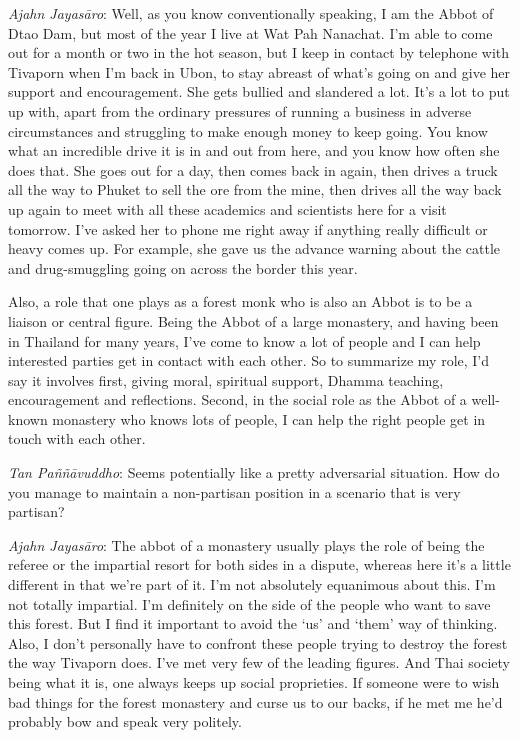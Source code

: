 \emph{Ajahn Jayasāro‎}: Well, as you know conventionally speaking, I am
the Abbot of Dtao Dam, but most of the year I live at Wat Pah Nanachat.
I'm able to come out for a month or two in the hot season, but I keep in
contact by telephone with Tivaporn when I'm back in Ubon, to stay
abreast of what's going on and give her support and encouragement. She
gets bullied and slandered a lot. It's a lot to put up with, apart from
the ordinary pressures of running a business in adverse circumstances
and struggling to make enough money to keep going. You know what an
incredible drive it is in and out from here, and you know how often she
does that. She goes out for a day, then comes back in again, then drives
a truck all the way to Phuket to sell the ore from the mine, then drives
all the way back up again to meet with all these academics and
scientists here for a visit tomorrow. I've asked her to phone me right
away if anything really difficult or heavy comes up. For example, she
gave us the advance warning about the cattle and drug-smuggling going on
across the border this year.

Also, a role that one plays as a forest monk who is also an Abbot is to
be a liaison or central figure. Being the Abbot of a large monastery,
and having been in Thailand for many years, I've come to know a lot of
people and I can help interested parties get in contact with each other.
So to summarize my role, I'd say it involves first, giving moral,
spiritual support, Dhamma teaching, encouragement and reflections.
Second, in the social role as the Abbot of a well-known monastery who
knows lots of people, I can help the right people get in touch with each
other.

\emph{Tan Paññāvuddho}‎: Seems potentially like a pretty adversarial
situation. How do you manage to maintain a non-partisan position in a
scenario that is very partisan?

\emph{Ajahn Jayasāro‎}: The abbot of a monastery usually plays the role
of being the referee or the impartial resort for both sides in a
dispute, whereas here it's a little different in that we're part of it.
I'm not absolutely equanimous about this. I'm not totally impartial. I'm
definitely on the side of the people who want to save this forest. But I
find it important to avoid the `us' and `them' way of thinking. Also, I
don't personally have to confront these people trying to destroy the
forest the way Tivaporn does. I've met very few of the leading figures.
And Thai society being what it is, one always keeps up social
proprieties. If someone were to wish bad things for the forest monastery
and curse us to our backs, if he met me he'd probably bow and speak very
politely.


